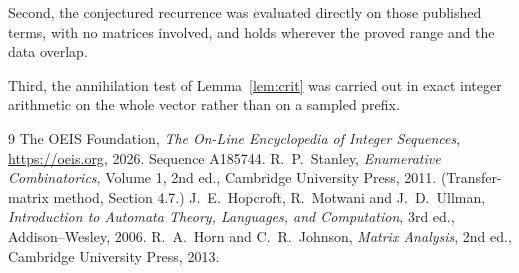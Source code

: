 \documentclass[11pt,a4paper]{article}
\theoremstyle{plain}
\theoremstyle{definition}
\begin{document}
Second, the conjectured recurrence was evaluated directly on those published terms, with no
matrices involved, and holds wherever the proved range and the data overlap.

Third, the annihilation test of Lemma~\ref{lem:crit} was carried out in exact integer
arithmetic on the whole vector rather than on a sampled prefix.

\begin{thebibliography}{9}
 The OEIS Foundation, \emph{The On-Line Encyclopedia of Integer
Sequences}, \url{https://oeis.org}, 2026. Sequence A185744.
 R.~P.~Stanley, \emph{Enumerative Combinatorics}, Volume 1, 2nd ed.,
Cambridge University Press, 2011. (Transfer-matrix method, Section 4.7.)
 J.~E.~Hopcroft, R.~Motwani and J.~D.~Ullman, \emph{Introduction to Automata
Theory, Languages, and Computation}, 3rd ed., Addison--Wesley, 2006.
 R.~A.~Horn and C.~R.~Johnson, \emph{Matrix Analysis}, 2nd ed., Cambridge
University Press, 2013.
\end{thebibliography}
\end{document}
